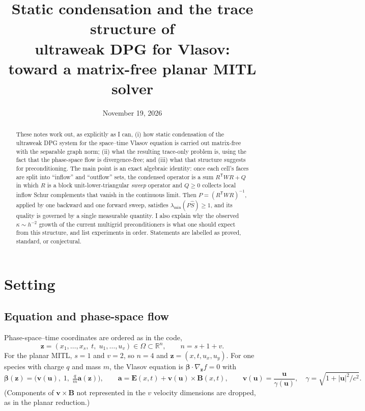 \documentclass[11pt]{article}
\title{Static condensation and the trace structure of\texorpdfstring{\\}{} ultraweak DPG for Vlasov:\texorpdfstring{\\}{} toward a matrix-free planar MITL solver}
\author{}
\date{November 19, 2026}
\theoremstyle{remark}
\theoremstyle{definition}
\newcommand{\bbeta}{\boldsymbol{\beta}}
\newcommand{\bz}{\boldsymbol{z}}
\newcommand{\bu}{\boldsymbol{u}}
\newcommand{\bv}{\boldsymbol{v}}
\newcommand{\bE}{\boldsymbol{E}}
\newcommand{\bB}{\boldsymbol{B}}
\newcommand{\ba}{\boldsymbol{a}}
\newcommand{\Shat}{\widehat{S}}
\newcommand{\R}{\mathbb{R}}
\newcommand{\T}{\mathsf{T}}
\begin{document}
\maketitle

\begin{abstract}
These notes work out, as explicitly as I can, (i) how static condensation of the ultraweak DPG system for the
space--time Vlasov equation is carried out matrix-free with the separable graph norm; (ii) what the resulting
trace-only problem is, using the fact that the phase-space flow is divergence-free; and (iii) what that structure
suggests for preconditioning.  The main point is an exact algebraic identity: once each cell's faces are split into
``inflow'' and ``outflow'' sets, the condensed operator is a sum $R^\T W R + Q$ in which $R$ is a block
unit-lower-triangular \emph{sweep} operator and $Q\ge 0$ collects local inflow Schur complements that vanish in the
continuous limit.  Then $P=(R^\T W R)^{-1}$, applied by one backward and one forward sweep, satisfies
$\lambda_{\min}(P\Shat)\ge 1$, and its quality is governed by a single measurable quantity.  I also explain why the
observed $\kappa\sim h^{-2}$ growth of the current multigrid preconditioners is what one should expect from this
structure, and list experiments in order.  Statements are labelled as proved, standard, or conjectural.
\end{abstract}

\tableofcontents

\section{Setting}

\subsection{Equation and phase-space flow}

Phase-space--time coordinates are ordered as in the code,
\[
  \bz = (x_1,\dots,x_s,\;t,\;u_1,\dots,u_v)\in\Omega\subset\R^{n},\qquad n=s+1+v .
\]
For the planar MITL, $s=1$ and $v=2$, so $n=4$ and $\bz=(x,t,u_x,u_y)$.  For one species with charge $q$ and mass
$m$, the Vlasov equation is $\bbeta\cdot\nabla_{\bz} f = 0$ with
\[
  \bbeta(\bz) = \bigl(\bv(\bu),\;1,\;\tfrac{q}{m}\ba(\bz)\bigr),\qquad
  \ba = \bE(x,t) + \bv(\bu)\times\bB(x,t),\qquad
  \bv(\bu) = \frac{\bu}{\gamma(\bu)},\quad \gamma=\sqrt{1+|\bu|^2/c^2}.
\]
(Components of $\bv\times\bB$ not represented in the $v$ velocity dimensions are dropped, as in the planar reduction.)
\end{document}
